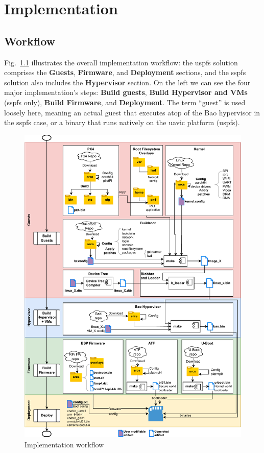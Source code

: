 %
\chapter{Implementation}
\label{cha:implementation}

\section{Workflow}
\label{sec:workflow}
Fig.~\ref{fig:uav-main-Implem-Workflow} illustrates the overall implementation
workflow: the \gls{uspfs} solution comprises the \textbf{Guests}, \textbf{Firmware},
and \textbf{Deployment} sections, and the \gls{sspfs} solution also includes the
\textbf{Hypervisor} section. On the left we can see the four major
implementation's steps: \textbf{Build guests},
\textbf{Build Hypervisor and VMs} (\gls{sspfs} only), \textbf{Build Firmware},
and \textbf{Deployment}. The term ``guest'' is used loosely here, meaning an
actual guest that executes atop of the Bao hypervisor in the \gls{sspfs} case,
or a binary that runs natively on the \gls{uavic} platform (\gls{uspfs}).

\begin{figure}[!hbt]
  \centering
  \includegraphics[width=1.0\textwidth]{./img/pdf/uav-main-Implem-Workflow} 
  \caption{Implementation workflow}%
  \label{fig:uav-main-Implem-Workflow}
\end{figure}

